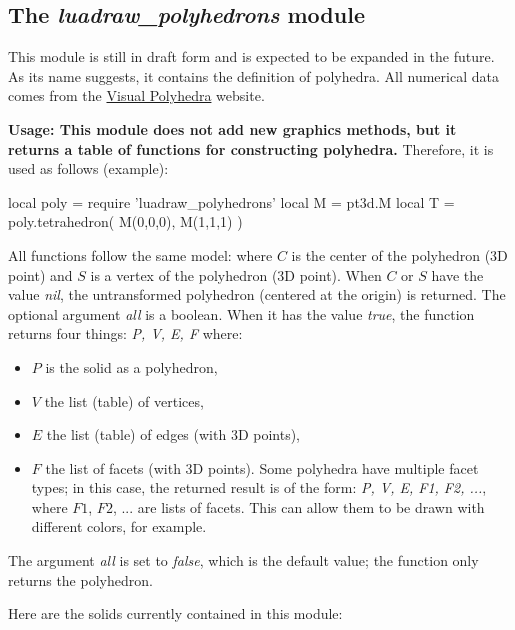 \subsection{The \emph{luadraw\_polyhedrons} module}

This module is still in draft form and is expected to be expanded in the future. As its name suggests, it contains the definition of polyhedra. All numerical data comes from the \href{https://dmccooey.com/polyhedra/}{Visual Polyhedra} website.

\textbf{Usage: This module does not add new graphics methods, but it returns a table of functions for constructing polyhedra.} Therefore, it is used as follows (example):
\begin{Luacode}
local poly = require 'luadraw_polyhedrons'
local M = pt3d.M
local T = poly.tetrahedron( M(0,0,0), M(1,1,1) )
\end{Luacode}

All functions follow the same model:  where $C$ is the center of the polyhedron (3D point) and $S$ is a vertex of the polyhedron (3D point). When $C$ or $S$ have the value \emph{nil}, the untransformed polyhedron (centered at the origin) is returned. The optional argument \emph{all} is a boolean. When it has the value \emph{true}, the function returns four things: \emph{P, V, E, F} where:
\begin{itemize}
    \item $P$ is the solid as a polyhedron,
    \item $V$ the list (table) of vertices,
    \item $E$ the list (table) of edges (with 3D points),
    \item $F$ the list of facets (with 3D points). Some polyhedra have multiple facet types; in this case, the returned result is of the form: \emph{P, V, E, F1, F2, ...}, where $F1$, $F2$, ... are lists of facets. This can allow them to be drawn with different colors, for example. \end{itemize}
The argument \emph{all} is set to \emph{false}, which is the default value; the function only returns the polyhedron.

Here are the solids currently contained in this module:

